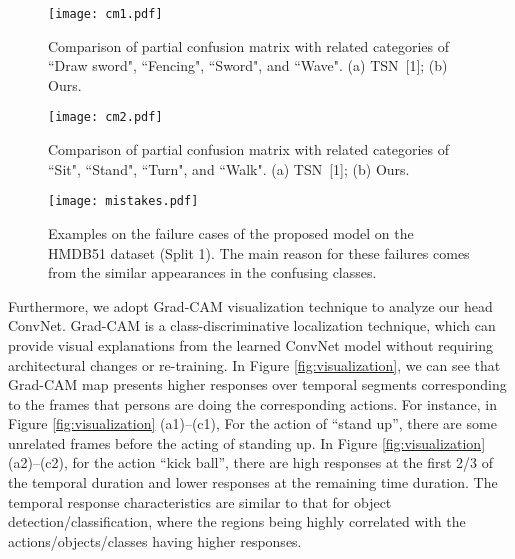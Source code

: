 \documentclass[english, 10pt, twocolumn, twoside]{IEEEtran}
\begin{document}
\begin{figure}[t]
	\begin{center}
		\texttt{[image: cm1.pdf]}
	\end{center}
	\vspace{-0.1in}
	\caption{Comparison of partial confusion matrix with related categories of ``Draw sword", ``Fencing", ``Sword", and ``Wave". (a) TSN~[1]; (b) Ours.}
	\label{fig:cm1}
\end{figure}
\begin{figure}[t]
	\begin{center}
		\texttt{[image: cm2.pdf]}
	\end{center}
	\vspace{-0.1in}
	\caption{Comparison of partial confusion matrix with related categories of ``Sit", ``Stand", ``Turn", and ``Walk". (a) TSN~[1]; (b) Ours.}
	\label{fig:cm2}
\end{figure}
\begin{figure}[h]
 \vspace{0.1mm}
 \begin{center}
\texttt{[image: mistakes.pdf]}
\caption{Examples on the failure cases of the proposed model on the HMDB51 dataset (Split 1). The main reason for these failures comes from the similar appearances in the confusing classes.}
 \label{fig:TSM-mistakes}
   \end{center}
\end{figure}

Furthermore, we adopt Grad-CAM visualization technique \cite{Selvaraju2016Grad} to analyze our head ConvNet. Grad-CAM is a class-discriminative localization technique, which can provide visual explanations from the learned ConvNet model without requiring architectural changes or re-training. In Figure \ref{fig:visualization}, we can see that Grad-CAM map presents higher responses over temporal segments corresponding to the frames that persons are doing the corresponding actions. For instance, in Figure \ref{fig:visualization} (a1)--(c1), For the action of ``stand up'', there are some unrelated frames before the acting of standing up. In Figure \ref{fig:visualization} (a2)--(c2), for the action ``kick ball'', there are high responses at the first 2/3 of the temporal duration and lower responses at the remaining time duration. The temporal response characteristics are similar to that for object detection/classification, where the regions being highly correlated with the actions/objects/classes having higher responses.
\end{document}
